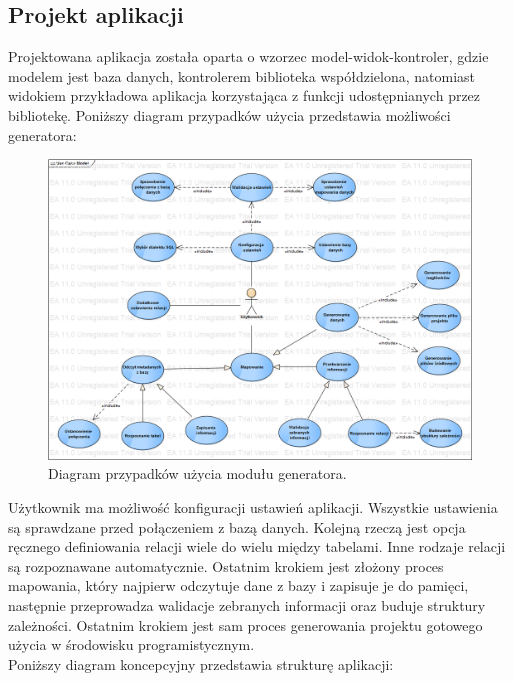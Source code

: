 \documentclass[12pt]{report}
\begin{document}
\subsection{Projekt aplikacji}
	\indent Projektowana aplikacja została oparta o wzorzec model-widok-kontroler, gdzie modelem jest baza danych, kontrolerem biblioteka współdzielona, natomiast widokiem przykładowa aplikacja korzystająca z funkcji udostępnianych przez bibliotekę. Poniższy diagram przypadków użycia przedstawia możliwości generatora:

\begin{figure}[h]
	\centering
	\includegraphics[width=1.5\textwidth, angle=90]{images/QubicUseCase.png}
	\caption{Diagram przypadków użycia modułu generatora.}
\end{figure}
\FloatBarrier

Użytkownik ma możliwość konfiguracji ustawień aplikacji. Wszystkie ustawienia są sprawdzane przed połączeniem z bazą danych. Kolejną rzeczą jest opcja ręcznego definiowania relacji wiele do wielu między tabelami. Inne rodzaje relacji są rozpoznawane automatycznie. Ostatnim krokiem jest złożony proces mapowania, który najpierw odczytuje dane z bazy i zapisuje je do pamięci, następnie przeprowadza walidacje zebranych informacji oraz buduje struktury zależności. Ostatnim krokiem jest sam proces generowania projektu gotowego użycia w środowisku programistycznym. \\
	\indent Poniższy diagram koncepcyjny przedstawia strukturę aplikacji:
	
\end{document}
